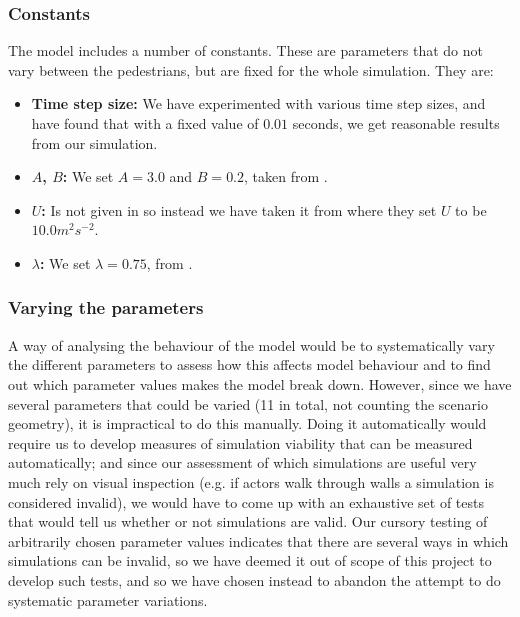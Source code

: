 \subsubsection{Constants} \label{constants}
The model includes a number of constants. These are parameters that do not 
vary between the pedestrians, but are fixed for the whole simulation. They are:

\begin{itemize}
    \item \textbf{Time step size:} We have experimented with various time step 
        sizes, and have found that with a fixed value of $0.01$ seconds, we 
        get reasonable results from our simulation.

    \item \textbf{$A$, $B$:} We set $A=3.0$ and $B=0.2$, taken from  
        \cite{self-org}.

    \item \textbf{$U$:} Is not given in \cite{self-org} so instead we have taken 
 			it from \cite{social-force} where they set $U$ to be $10.0 m^2 s^{-2}$.

    \item \textbf{$\lambda$:} We set $\lambda=0.75$, from 
            \cite{self-org}.
\end{itemize}

\subsubsection{Varying the parameters}
\label{sec:varying-constants}
A way of analysing the behaviour of the model would be to systematically vary 
the different parameters to assess how this affects model behaviour and to 
find out which parameter values makes the model break down. However, since we 
have several parameters that could be varied (11 in total, not counting the 
scenario geometry), it is impractical to do this manually. Doing it 
automatically would require us to develop measures of simulation viability 
that can be measured automatically; and since our assessment of which 
simulations are useful very much rely on visual inspection (e.g. if actors 
walk through walls a simulation is considered invalid), we would have to come 
up with an exhaustive set of tests that would tell us whether or not 
simulations are valid. Our cursory testing of arbitrarily chosen parameter 
values indicates that there are several ways in which simulations can be 
invalid, so we have deemed it out of scope of this project to develop such 
tests, and so we have chosen instead to abandon the attempt to do systematic 
parameter variations.

